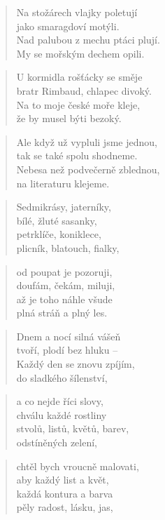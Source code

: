 \documentclass{book}
\begin{document}
\begin{verse}
Na stožárech vlajky poletují\\
jako smaragdoví motýli.\\
Nad palubou z mechu ptáci plují.\\
My se mořským dechem opili.
\end{verse}
\begin{verse}
U kormidla rošťácky se směje\\
bratr Rimbaud, chlapec divoký.\\
Na to moje české moře kleje,\\
že by musel býti bezoký.
\end{verse}
\begin{verse}
Ale když už vypluli jsme jednou,\\
tak se také spolu shodneme.\\
Nebesa než podvečerně zblednou,\\
na literaturu klejeme.
\end{verse}
\newpage
{}
\begin{verse}
Sedmikrásy, jaterníky,\\
bílé, žluté sasanky,\\
petrklíče, koniklece,\\
plicník, blatouch, fialky,
\end{verse}
\begin{verse}
od poupat je pozoruji,\\
doufám, čekám, miluji,\\
až je toho náhle všude\\
plná stráň a plný les.
\end{verse}
\begin{verse}
Dnem a nocí silná vášeň\\
tvoří, plodí bez hluku --\\
Každý den se znovu zpíjím,\\
do sladkého šílenství,
\end{verse}
\begin{verse}
a co nejde říci slovy,\\
chválu každé rostliny\\
stvolů, listů, květů, barev,\\
odstíněných zelení,
\end{verse}
\begin{verse}
chtěl bych vroucně malovati,\\
aby každý list a květ,\\
každá kontura a barva\\
pěly radost, lásku, jas,
\end{verse}
\end{document}
